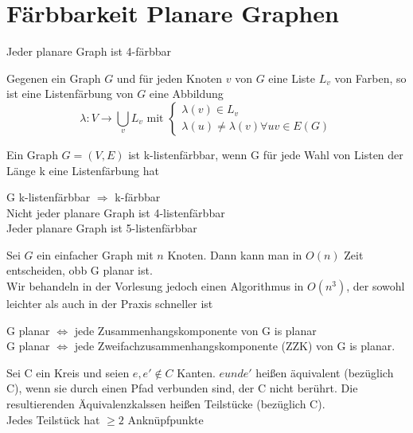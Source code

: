 \documentclass[14pt]{article}
\begin{document}
\section{Färbbarkeit Planare Graphen}
\begin{eigenschaft}
    Jeder planare Graph ist 4-färbbar
\end{eigenschaft}
\begin{definition}[Listenfärbung]
    Gegenen ein Graph $G$ und für jeden Knoten $v$ von $G$ eine Liste $L_v$
    von Farben, so ist eine Listenfärbung von $G$ eine Abbildung
    \begin{equation*}
        \lambda: V \rightarrow \bigcup_v L_v \text{ mit } 
        \begin{cases}
            \lambda(v) \in L_v \\
            \lambda(u) \neq \lambda(v) \forall uv \in E(G)
        \end{cases}
    \end{equation*}
\end{definition}
\begin{definition}[Listenfärbbarkeit]
    Ein Graph $G = (V, E)$ ist k-listenfärbbar, wenn G für jede Wahl
    von Listen der Länge k eine Listenfärbung hat
\end{definition}
\begin{eigenschaft}
    G k-listenfärbbar $\Rightarrow$ k-färbbar \\
    Nicht jeder planare Graph ist 4-listenfärbbar \\
    Jeder planare Graph ist 5-listenfärbbar
\end{eigenschaft}
\begin{eigenschaft}
    Sei $G$ ein einfacher Graph mit $n$ Knoten. Dann kann man in 
    $O(n)$ Zeit entscheiden, obb G planar ist. \\
    Wir behandeln in der Vorlesung jedoch einen Algorithmus in 
    $O(n^3)$, der sowohl leichter als auch in der Praxis schneller
    ist
\end{eigenschaft}
\begin{eigenschaft}
    G planar $\Leftrightarrow$ jede Zusammenhangskomponente von G is planar \\
    G planar $\Leftrightarrow$ jede Zweifachzusammenhangskomponente (ZZK) von
    G is planar.
\end{eigenschaft}
\begin{definition}[Teilstück]
    Sei C ein Kreis und seien $e, e' \notin C$ Kanten. $e und e'$ heißen
    äquivalent (bezüglich C), wenn sie durch einen Pfad verbunden sind,
    der C nicht berührt. Die resultierenden Äquivalenzkalssen heißen
    Teilstücke (bezüglich C). \\
    Jedes Teilstück hat $\geq 2$ Anknüpfpunkte
\end{definition}
\end{document}
